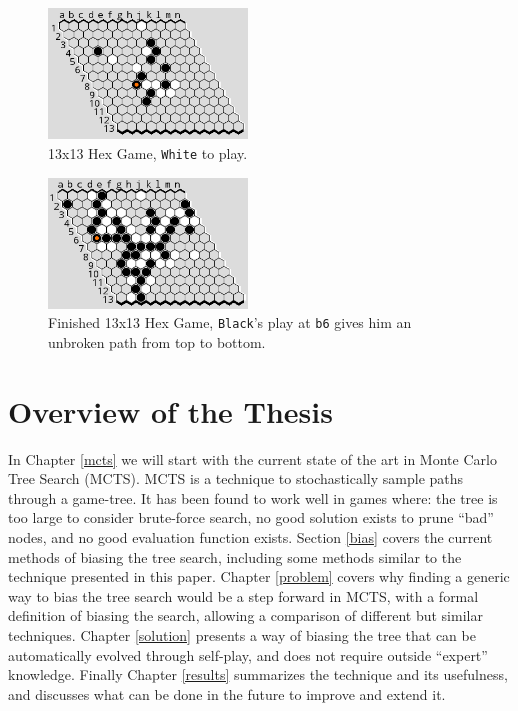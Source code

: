 \documentclass[10pt,a4paper]{report}
\newcommand{\black}{\texttt{Black}}
\newcommand{\white}{\texttt{White}}
\newcommand{\loc}[1]{\texttt{#1}}
\begin{document}
\begin{figure}
	\begin{center}
	\includegraphics[width=200px]{graphics/13x13-in-progress.png}
	\caption{13x13 Hex Game, \white{} to play.}
	\end{center}
	\label{fig:13x13inprogress}
\end{figure}
\begin{figure}
	\begin{center}
	\includegraphics[width=200px]{graphics/13x13-finished.png}
	\caption{Finished 13x13 Hex Game, \black{}'s play at \loc{b6} gives him an unbroken path from top to bottom.}
	\end{center}
	\label{fig:13x13finished}
\end{figure}

\section{Overview of the Thesis}\label{overview}
In Chapter \ref{mcts} we will start with the current state of the art in Monte Carlo Tree Search (MCTS). MCTS is a technique to stochastically sample paths through a game-tree. It has been found to work well in games where: the tree is too large to consider brute-force search, no good solution exists to prune ``bad'' nodes, and no good evaluation function exists. Section \ref{bias} covers the current methods of biasing the tree search, including some methods similar to the technique presented in this paper. Chapter \ref{problem} covers why finding a generic way to bias the tree search would be a step forward in MCTS, with a formal definition of biasing the search, allowing a comparison of different but similar techniques. Chapter \ref{solution} presents a way of biasing the tree that can be automatically evolved through self-play, and does not require outside ``expert'' knowledge. Finally Chapter \ref{results} summarizes the technique and its usefulness, and discusses what can be done in the future to improve and extend it.
\end{document}
